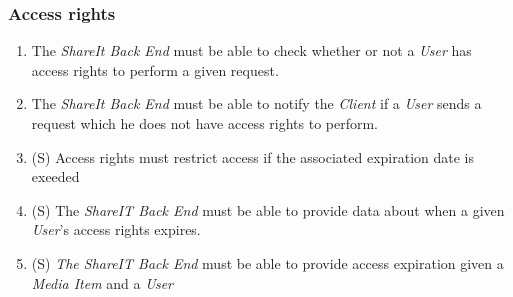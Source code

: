 \subsubsection{Access rights}
\begin{enumerate}[label=\textbf{FR-\twodigits*},resume]

\item The \textit{ShareIt Back End} must be able to check whether or not a \textit{User} has access rights to perform a given request.

\item The \textit{ShareIt Back End} must be able to notify the \textit{Client} if a \textit{User} sends a request which he does not have access rights to perform.

\item (S) Access rights must restrict access if the associated expiration date is exeeded

\item (S) The \textit{ShareIT Back End} must be able to provide data about when a given \textit{User}'s access rights expires.

\item (S) \textit{The ShareIT Back End} must be able to provide access expiration given a \textit{Media Item} and a \textit{User}

\end{enumerate}

%